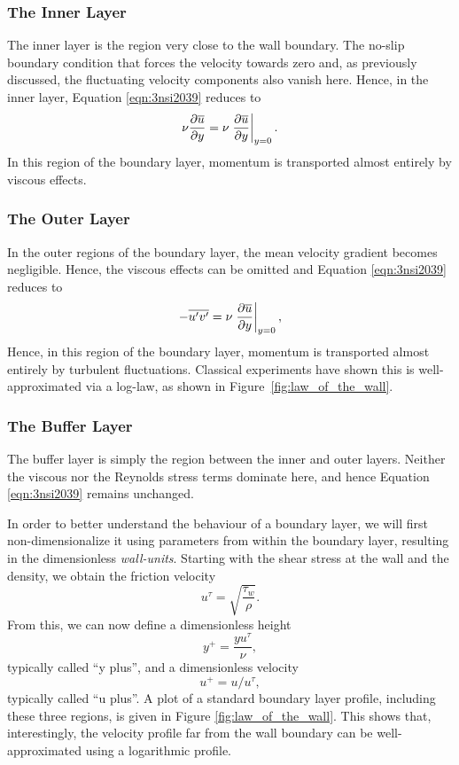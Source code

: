 \subsubsection{The Inner Layer}
The inner layer is the region very close to the wall boundary. The no-slip boundary condition that forces the velocity towards zero and, as previously discussed, the fluctuating velocity components also vanish here. Hence, in the inner layer, Equation \ref{eqn:3nsi2039} reduces to
\begin{equation}
	\label{eqn:3nsi2039}
	\nu \frac{\partial \overline{u}}{\partial y} = \nu \left.\frac{\partial \overline{u}}{\partial y}\right\rvert_{y=0}^{}.
\end{equation}
In this region of the boundary layer, momentum is transported almost entirely by viscous effects.
\subsubsection{The Outer Layer}
In the outer regions of the boundary layer, the mean velocity gradient becomes negligible. Hence, the viscous effects can be omitted and Equation \ref{eqn:3nsi2039} reduces to
\begin{equation}
	\label{eqn:3nsi2039}
	 - \overline{u^\prime v^\prime} = \nu \left.\frac{\partial \overline{u}}{\partial y}\right\rvert_{y=0}^{},
\end{equation}
Hence, in this region of the boundary layer, momentum is transported almost entirely by turbulent fluctuations. Classical experiments have shown this is well-approximated via a log-law, as shown in Figure~\ref{fig:law_of_the_wall}.
\subsubsection{The Buffer Layer}
The buffer layer is simply the region between the inner and outer layers. Neither the viscous nor the Reynolds stress terms dominate here, and hence Equation \ref{eqn:3nsi2039} remains unchanged.

In order to better understand the behaviour of a boundary layer, we will first non-dimensionalize it using parameters from within the boundary layer, resulting in the dimensionless {\it wall-units}. Starting with the shear stress at the wall and the density, we obtain the friction velocity
\begin{equation}
	u^{\tau} = \sqrt{\frac{\tau_w}{\rho}}.
\end{equation}
From this, we can now define a dimensionless height
\begin{equation}
	y^+ = \frac{y u^{\tau}}{\nu},
\end{equation} 
typically called ``y plus'', and a dimensionless velocity
\begin{equation}
	u^+ = u/u^{\tau},
\end{equation} 
typically called ``u plus''. A plot of a standard boundary layer profile, including these three regions, is given in Figure \ref{fig:law_of_the_wall}. This shows that, interestingly, the velocity profile far from the wall boundary can be well-approximated using a logarithmic profile.
